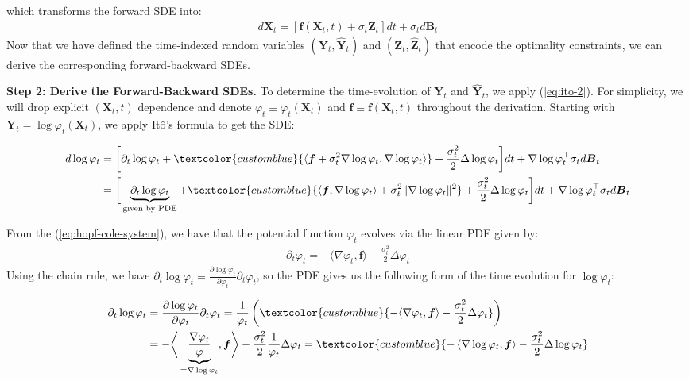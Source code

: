 \documentclass{article}
\newcommand{\bluetext}[1]{\textcolor{customblue}{#1}}
\begin{document}
which transforms the forward SDE into:
\begin{align}
    d\boldsymbol{X}_t=\left[\boldsymbol{f}(\boldsymbol{X}_t,t)+ \sigma_t \boldsymbol{Z}_t\right]dt+\sigma_t d\boldsymbol{B}_t
\end{align}
Now that we have defined the time-indexed random variables $(\boldsymbol{Y}_t, \widehat{\boldsymbol{Y}}_t)$ and $(\boldsymbol{Z}_t, \widehat{\boldsymbol{Z}}_t)$ that encode the optimality constraints, we can derive the corresponding forward-backward SDEs.

\textbf{Step 2: Derive the Forward-Backward SDEs.} 
To determine the time-evolution of $\boldsymbol{Y}_t$ and $\widehat{\boldsymbol{Y}}_t$, we apply (\ref{eq:ito-2}). For simplicity, we will drop explicit $(\boldsymbol{X}_t,t)$ dependence and denote $\varphi_t\equiv\varphi_t(\boldsymbol{X}_t)$ and $\boldsymbol{f}\equiv\boldsymbol{f}(\boldsymbol{X}_t,t)$ throughout the derivation. Starting with $\boldsymbol{Y}_t=\log \varphi_t(\boldsymbol{X}_t)$, we apply Itô's formula to get the SDE:
\begin{small}
\begin{align}
    d\log \varphi_t&=\bigg[\partial_t \log \varphi_t+\bluetext{\langle \boldsymbol{f}+\sigma^2_t\nabla \log \varphi_t,  \nabla \log \varphi_t\rangle}+\frac{\sigma^2_t}{2}\Delta \log\varphi_t\bigg]dt+\nabla \log\varphi_t^\top \sigma_t d \boldsymbol{B}_t\nonumber\\
    &=\bigg[\underbrace{\partial_t \log \varphi_t}_{\text{given by  PDE}}+\bluetext{\langle \boldsymbol{f},\nabla \log \varphi_t\rangle+\sigma^2_t\|\nabla \log \varphi_t\|^2 }+\frac{\sigma^2_t}{2}\Delta \log\varphi_t\bigg]dt+\nabla \log\varphi_t^\top \sigma_t d \boldsymbol{B}_t\label{eq:fwd-potential-sde}
\end{align}
\end{small}
From the (\ref{eq:hopf-cole-system}), we have that the potential function $\varphi_t$ evolves via the linear PDE given by:
\begin{align}
    \partial_t \varphi_t=-\langle \nabla \varphi_t, \boldsymbol{f}\rangle-\frac{\sigma^2_t}{2}\Delta\varphi_t
\end{align}
Using the chain rule, we have $\partial_t\log \varphi_t=\frac{\partial \log \varphi_t}{\partial \varphi_t}\partial_t \varphi_t$, so the PDE gives us the following form of the time evolution for $\log\varphi_t$:
\begin{small}
\begin{align}
    \partial_t\log \varphi_t&=\frac{\partial \log \varphi_t}{\partial \varphi_t}\partial_t \varphi_t=\frac{1}{\varphi_t}\left(\bluetext{-\langle \nabla \varphi_t, \boldsymbol{f}\rangle-\frac{\sigma^2_t}{2}\Delta\varphi_t}\right)\nonumber\\
    &=-\bigg\langle\underbrace{\frac{\nabla \varphi_t}{\varphi}}_{=\nabla \log \varphi_t}, \boldsymbol{f}\bigg\rangle-\frac{\sigma^2_t}{2}\frac{1}{\varphi_t}\Delta \varphi_t=\bluetext{-\left\langle\nabla\log \varphi_t, \boldsymbol{f}\right\rangle -\frac{\sigma^2_t}{2}\Delta \log \varphi_t}
\end{align}
\end{small}
\end{document}
